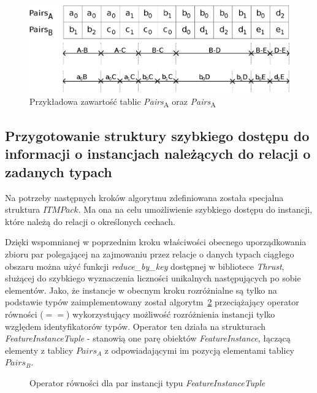 \documentclass[12pt]{article}
\begin{document}
\begin{figure}[H]
\centering
\includegraphics[width=\textwidth]{order_prop1.eps}
\caption{Przykładowa zawartość tablic \textit{Pairs}\textsubscript{A} oraz \textit{Pairs}\textsubscript{A}}
\label{fig:pairs_content}
\end{figure}

\subsection{Przygotowanie struktury szybkiego dostępu do informacji o instancjach należących do relacji o zadanych typach}

Na potrzeby następnych kroków algorytmu zdefiniowana została specjalna struktura $ ITMPack $. Ma ona na celu umożliwienie szybkiego dostępu do instancji, które należą do relacji o określonych cechach. 

Dzięki wspomnianej w poprzednim kroku właściwości obecnego uporządkowania zbioru par polegającej na zajmowaniu przez relacje o danych typach ciągłego obszaru można użyć funkcji \textit{reduce\_by\_key} dostępnej w bibliotece \textit{Thrust}, służącej do szybkiego wyznaczenia liczności unikalnych następujących po sobie elementów. Jako, że instancje w obecnym kroku rozróżnialne są tylko na podstawie typów zaimplementowany został algorytm~\ref{alg:FeatureInstanceTuple_operator} przeciążający operator równości ($ == $) wykorzystujący możliwość rozróżnienia instancji tylko względem identyfikatorów typów. Operator ten działa na strukturach \textit{FeatureInstanceTuple} - stanowią one parę obiektów \textit{FeatureInstance}, łączącą elementy z tablicy $ Pairs_{A} $ z odpowiadającymi im pozycją elementami tablicy $ Pairs_{B} $.

\begin{figure}[H]
\begin{algorithm}[H]
\caption{Operator równości dla par instancji typu \textit{FeatureInstanceTuple}}
\label{alg:FeatureInstanceTuple_operator}
\end{algorithm}
\end{figure}
\end{document}
